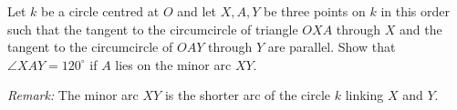 Let $k$ be a circle centred at $O$ and let $X,A,Y$ be three points on $k$ in this order such that
the tangent to the circumcircle of triangle $OXA$ through $X$ and
the tangent to the circumcircle of $OAY$ through $Y$ are parallel.
Show that $\angle XAY = 120^\circ$ if $A$ lies on the minor arc $XY$.

\emph{Remark:} The minor arc $XY$ is the shorter arc of the circle $k$ linking $X$ and $Y$.
